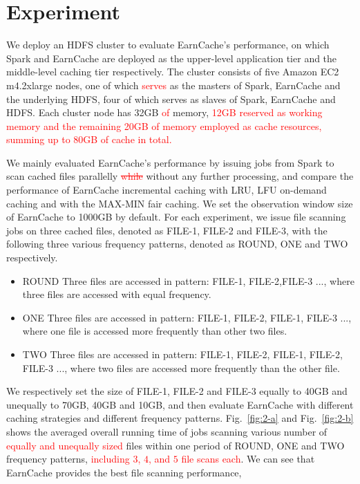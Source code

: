 \section{Experiment}\label{sec:Experiments}

We deploy an HDFS cluster to evaluate EarnCache's performance, on which Spark and EarnCache are deployed as the upper-level application tier and the middle-level caching tier respectively.
The cluster consists of five Amazon EC2 m4.2xlarge nodes, one of which \textcolor{red}{serves} as the masters of Spark, EarnCache and the underlying HDFS, four of which serves as slaves of Spark, EarnCache and HDFS.
Each cluster node has 32GB \textcolor{red}{of} memory, \textcolor{red}{12GB reserved as working memory and the remaining 20GB of memory employed as cache resources, summing up to 80GB of cache in total.}

We mainly evaluated EarnCache's performance by issuing jobs from Spark to scan cached files parallelly \textcolor{red}{\sout{while}} without any further processing, and compare the performance of EarnCache incremental caching with LRU, LFU on-demand caching and with the MAX-MIN fair caching. We set the observation window size of EarnCache to 1000GB by default. For each experiment, we issue file scanning jobs on three cached files, denoted as FILE-1, FILE-2 and FILE-3, with the following three various frequency patterns, denoted as ROUND, ONE and TWO respectively.
\begin{itemize}
\item ROUND Three files are accessed in pattern: FILE-1, FILE-2,FILE-3 ..., where three files are accessed with equal frequency.
\item ONE Three files are accessed in pattern: FILE-1, FILE-2, FILE-1, FILE-3 ..., where one file is accessed more frequently than other two files.
\item TWO Three files are accessed in pattern: FILE-1, FILE-2, FILE-1, FILE-2, FILE-3 ..., where two files are accessed more frequently than the other file.
\end{itemize}

We respectively set the size of FILE-1, FILE-2 and FILE-3 equally to 40GB and unequally to 70GB, 40GB and 10GB, and then evaluate EarnCache with different caching strategies and different frequency patterns. Fig.~\ref{fig:2-a} and Fig.~\ref{fig:2-b} shows the averaged overall running time of jobs scanning various number of \textcolor{red}{equally and unequally sized} files within one period of ROUND, ONE and TWO frequency patterns, \textcolor{red}{including $3$, $4$, and $5$ file scans each}. We can see that EarnCache provides the best file scanning performance,


